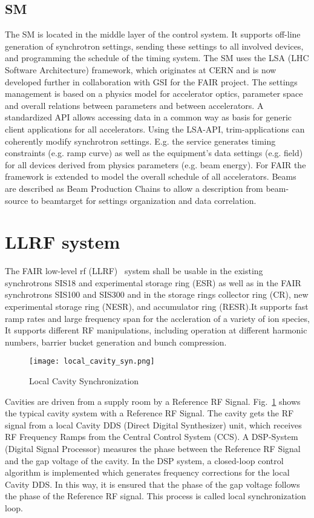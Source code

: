 \subsection{SM}
The \gls{SM} is located in the middle layer of the control system. It supports off-line generation of synchrotron settings, sending these settings to all involved devices,
and programming the schedule of the timing system. The SM uses the LSA (LHC Software Architecture) framework, which originates at CERN and is now developed further in collaboration with GSI for the FAIR project. The settings management is based on a physics model for accelerator optics, parameter space and overall relations between parameters and between accelerators. A standardized API allows accessing data in a common way as basis for generic client applications for all accelerators. Using the LSA-API, trim-applications can coherently modify synchrotron settings. E.g. the service generates timing constraints (e.g. ramp curve) as well as the equipment’s data settings (e.g. field) for all devices derived from physics parameters (e.g. beam energy). For FAIR the framework is extended to model the overall schedule of all accelerators. Beams are described as Beam Production
Chains to allow a description from beam-source to beamtarget for settings organization and data correlation.

\section{LLRF system}
The FAIR low-level rf (\gls{LLRF})~\cite{klingbeil_new_2011} system shall be usable in the existing synchrotrons SIS18 and experimental storage ring (\gls{ESR}) as well as in the FAIR synchrotrons SIS100 and SIS300 and in the storage rings collector ring (\gls{CR}), new experimental storage ring (\gls{NESR}), and accumulator ring (\gls{RESR}).It supports fast ramp rates and large frequency span for the accleration of a variety of ion species, It supports different RF manipulations, including operation at different harmonic numbers, barrier bucket generation and bunch compression. 
\begin{figure}[H]
   \centering   
   \texttt{[image: local\_cavity\_syn.png]}
   \caption{Local Cavity Synchronization}
   \label{local_cavity_syn}
\end{figure}
Cavities are driven from a supply room by a Reference RF Signal. Fig.~\ref{local_cavity_syn} shows the typical cavity system with a Reference RF Signal. The cavity gets the RF signal from a local Cavity DDS (Direct Digital Synthesizer) unit, which receives RF Frequency Ramps from the Central Control System (\gls{CCS}). A \gls{DSP}-System (Digital Signal Processor) measures the phase between the Reference RF Signal and the gap voltage of the cavity. In the DSP system, a closed-loop control algorithm is implemented which generates frequency corrections for the local Cavity DDS. In this way, it is ensured that the phase of the gap voltage follows the phase of the Reference RF signal. This process is called local synchronization loop.                                                                                     

